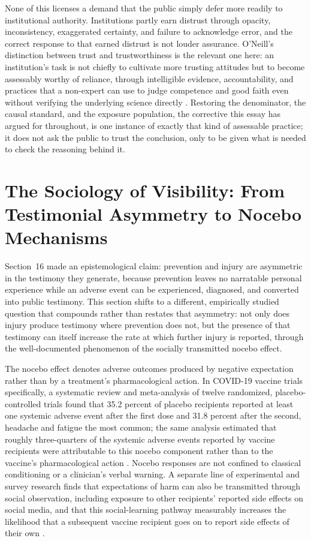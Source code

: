 \documentclass[11pt]{article}
\begin{document}
None of this licenses a demand that the public simply defer more readily to institutional authority. Institutions partly earn distrust through opacity, inconsistency, exaggerated certainty, and failure to acknowledge error, and the correct response to that earned distrust is not louder assurance. O'Neill's distinction between trust and trustworthiness is the relevant one here: an institution's task is not chiefly to cultivate more trusting attitudes but to become assessably worthy of reliance, through intelligible evidence, accountability, and practices that a non-expert can use to judge competence and good faith even without verifying the underlying science directly \citep{oneill2002}. Restoring the denominator, the causal standard, and the exposure population, the corrective this essay has argued for throughout, is one instance of exactly that kind of assessable practice; it does not ask the public to trust the conclusion, only to be given what is needed to check the reasoning behind it.

\section{The Sociology of Visibility: From Testimonial Asymmetry to Nocebo Mechanisms}

Section~16 made an epistemological claim: prevention and injury are asymmetric in the testimony they generate, because prevention leaves no narratable personal experience while an adverse event can be experienced, diagnosed, and converted into public testimony. This section shifts to a different, empirically studied question that compounds rather than restates that asymmetry: not only does injury produce testimony where prevention does not, but the presence of that testimony can itself increase the rate at which further injury is reported, through the well-documented phenomenon of the socially transmitted nocebo effect.

The nocebo effect denotes adverse outcomes produced by negative expectation rather than by a treatment's pharmacological action. In COVID-19 vaccine trials specifically, a systematic review and meta-analysis of twelve randomized, placebo-controlled trials found that 35.2 percent of placebo recipients reported at least one systemic adverse event after the first dose and 31.8 percent after the second, headache and fatigue the most common; the same analysis estimated that roughly three-quarters of the systemic adverse events reported by vaccine recipients were attributable to this nocebo component rather than to the vaccine's pharmacological action \citep{haas2022}. Nocebo responses are not confined to classical conditioning or a clinician's verbal warning. A separate line of experimental and survey research finds that expectations of harm can also be transmitted through social observation, including exposure to other recipients' reported side effects on social media, and that this social-learning pathway measurably increases the likelihood that a subsequent vaccine recipient goes on to report side effects of their own \citep{tan2022}.
\end{document}
